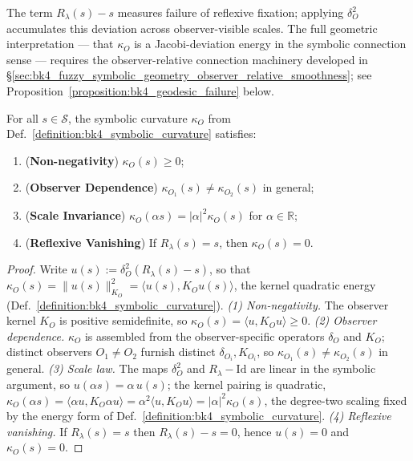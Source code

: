 \begin{remark}
The term $R_\lambda(s) - s$ measures failure of reflexive fixation; applying $\delta_O^2$
accumulates this deviation across observer-visible scales. The full geometric interpretation
--- that $\kappa_O$ is a Jacobi-deviation energy in the symbolic connection sense ---
requires the observer-relative connection machinery developed in
\S\ref{sec:bk4_fuzzy_symbolic_geometry_observer_relative_smoothness};
see Proposition~\ref{proposition:bk4_geodesic_failure} below.
\end{remark}

\begin{theorem}
\label{theorem:bk4_symbolic_curvature_properties}
For all $s \in \mathcal{S}$, the symbolic curvature $\kappa_O$ from Def.~\ref{definition:bk4_symbolic_curvature} satisfies:
\begin{enumerate}
    \item (\textbf{Non-negativity}) $\kappa_O(s) \geq 0$;
    \item (\textbf{Observer Dependence}) $\kappa_{O_1}(s) \ne \kappa_{O_2}(s)$ in general;
    \item (\textbf{Scale Invariance}) $\kappa_O(\alpha s) = |\alpha|^2 \kappa_O(s)$ for $\alpha \in \mathbb{R}$;
    \item (\textbf{Reflexive Vanishing}) If $R_\lambda(s) = s$, then $\kappa_O(s) = 0$.
\end{enumerate}
\end{theorem}

\begin{proof}
\label{proof:bk4_symbolic_curvature_properties}
\leavevmode
Write $u(s) := \delta_O^2(R_\lambda(s) - s)$, so that $\kappa_O(s) = \|u(s)\|_{K_O}^2 = \langle u(s), K_O u(s)\rangle$, the kernel quadratic energy (Def.~\ref{definition:bk4_symbolic_curvature}).
\emph{(1) Non-negativity.} The observer kernel $K_O$ is positive semidefinite, so $\kappa_O(s) = \langle u, K_O u\rangle \ge 0$.
\emph{(2) Observer dependence.} $\kappa_O$ is assembled from the observer-specific operators $\delta_O$ and $K_O$; distinct observers $O_1 \neq O_2$ furnish distinct $\delta_{O_i}, K_{O_i}$, so $\kappa_{O_1}(s) \neq \kappa_{O_2}(s)$ in general.
\emph{(3) Scale law.} The maps $\delta_O^2$ and $R_\lambda - \mathrm{Id}$ are linear in the symbolic argument, so $u(\alpha s) = \alpha\,u(s)$; the kernel pairing is quadratic, $\kappa_O(\alpha s) = \langle \alpha u, K_O \alpha u\rangle = \alpha^2 \langle u, K_O u\rangle = |\alpha|^2 \kappa_O(s)$, the degree-two scaling fixed by the energy form of Def.~\ref{definition:bk4_symbolic_curvature}.
\emph{(4) Reflexive vanishing.} If $R_\lambda(s) = s$ then $R_\lambda(s) - s = 0$, hence $u(s) = 0$ and $\kappa_O(s) = 0$.
\end{proof}

